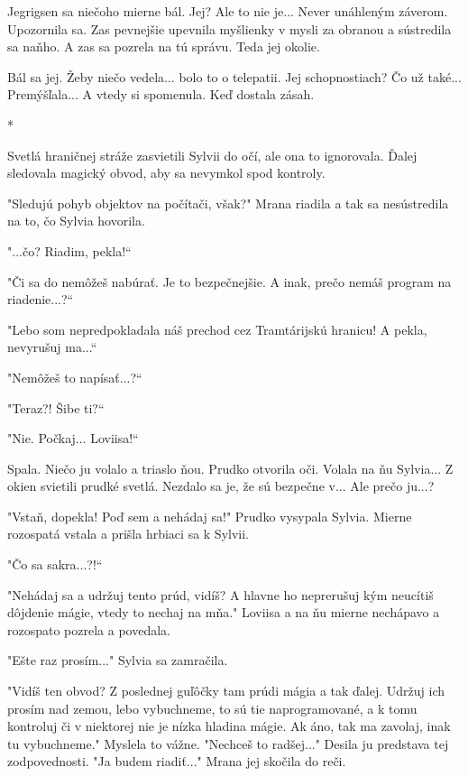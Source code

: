 \documentclass{book}
\begin{document}
Jegrigsen sa niečoho mierne bál. Jej? Ale to nie je... Never unáhleným záverom. Upozornila sa. Zas pevnejšie upevnila myšlienky v mysli za obranou a sústredila sa naňho. A zas sa pozrela na tú správu. Teda jej okolie.

Bál sa jej. Žeby niečo vedela... bolo to o telepatii. Jej schopnostiach? Čo už také... Premýšľala... A vtedy si spomenula. Keď dostala zásah.

\begin{center}

*

\end{center}

Svetlá hraničnej stráže zasvietili Sylvii do očí, ale ona to ignorovala. Ďalej sledovala magický obvod, aby sa nevymkol spod kontroly.

"$ $Sledujú pohyb objektov na počítači, však?"$ $ Mrana riadila a tak sa nesústredila na to, čo Sylvia hovorila.

"$ $...čo? Riadim, pekla!“

"$ $Či sa do nemôžeš nabúrať. Je to bezpečnejšie. A inak, prečo nemáš program na riadenie...?“

"$ $Lebo som nepredpokladala náš prechod cez Tramtárijskú hranicu! A pekla, nevyrušuj ma...“

"$ $Nemôžeš to napísať...?“

"$ $Teraz?! Šibe ti?“

"$ $Nie. Počkaj... Loviisa!“

Spala. Niečo ju volalo a triaslo ňou. Prudko otvorila oči. Volala na ňu Sylvia... Z okien svietili prudké svetlá. Nezdalo sa je, že sú bezpečne v... Ale prečo ju...?

"$ $Vstaň, dopekla! Poď sem a nehádaj sa!"$ $ Prudko vysypala Sylvia. Mierne rozospatá vstala a prišla hrbiaci sa k Sylvii.

"$ $Čo sa sakra...?!“

"$ $Nehádaj sa a udržuj tento prúd, vidíš? A hlavne ho neprerušuj kým neucítiš dôjdenie mágie, vtedy to nechaj na mňa."$ $ Loviisa a na ňu mierne nechápavo a rozospato pozrela a povedala.

"$ $Ešte raz prosím..."$ $ Sylvia sa zamračila.

"$ $Vidíš ten obvod? Z poslednej guľôčky tam prúdi mágia a tak ďalej. Udržuj ich prosím nad zemou, lebo vybuchneme, to sú tie naprogramované, a k tomu kontroluj či v niektorej nie je nízka hladina mágie. Ak áno, tak ma zavolaj, inak tu vybuchneme."$ $ Myslela to vážne. "$ $Nechceš to radšej..."$ $ Desila ju predstava tej zodpovednosti. "$ $Ja budem riadiť..."$ $ Mrana jej skočila do reči.
\end{document}
